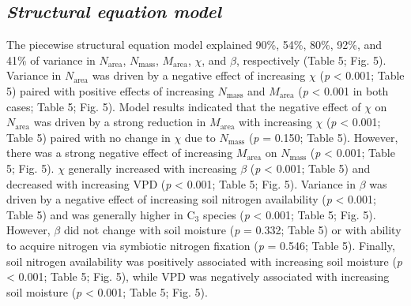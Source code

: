 \subsection{\textit{Structural equation model}}
The piecewise structural equation model explained 90\%, 54\%, 80\%, 92\%, and 41\% of variance in $N_\mathrm{area}$, $N_\mathrm{mass}$, $M_\mathrm{area}$, $\chi$, and $\beta$, respectively (Table 5; Fig. 5). Variance in $N_\mathrm{area}$ was driven by a negative effect of increasing $\chi$ (\textit{p} < 0.001; Table 5) paired with positive effects of increasing $N_\mathrm{mass}$ and $M_\mathrm{area}$ (\textit{p} < 0.001 in both cases; Table 5; Fig. 5). Model results indicated that the negative effect of $\chi$ on $N_\mathrm{area}$ was driven by a strong reduction in $M_\mathrm{area}$ with increasing $\chi$ (\textit{p} < 0.001; Table 5) paired with no change in $\chi$ due to $N_\mathrm{mass}$ (\textit{p} = 0.150; Table 5). However, there was a strong negative effect of increasing $M_\mathrm{area}$ on $N_\mathrm{mass}$ (\textit{p} < 0.001; Table 5; Fig. 5). $\chi$ generally increased with increasing $\beta$  (\textit{p} < 0.001; Table 5) and decreased with increasing VPD (\textit{p} < 0.001; Table 5; Fig. 5). Variance in $\beta$  was driven by a negative effect of increasing soil nitrogen availability (\textit{p} < 0.001; Table 5) and was generally higher in C$_3$ species (\textit{p} < 0.001; Table 5; Fig. 5). However, $\beta$ did not change with soil moisture (\textit{p} = 0.332; Table 5) or with ability to acquire nitrogen via symbiotic nitrogen fixation (\textit{p} = 0.546; Table 5). Finally, soil nitrogen availability was positively associated with increasing soil moisture (\textit{p} < 0.001; Table 5; Fig. 5), while VPD was negatively associated with increasing soil moisture (\textit{p} < 0.001; Table 5; Fig. 5).

